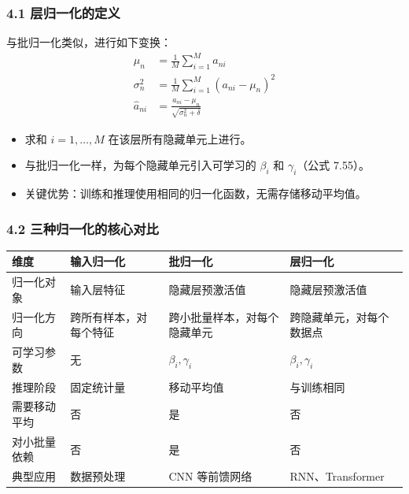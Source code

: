 \documentclass[t,aspectratio=169]{beamer} %
\begin{document}
\begin{frame}
    \frametitle{4.1 层归一化的定义}
    与批归一化类似，进行如下变换：
    \begin{align}
        \mu_n &= \frac{1}{M} \sum_{i=1}^M a_{ni} \tag{7.58} \\
        \sigma_n^2 &= \frac{1}{M} \sum_{i=1}^M (a_{ni} - \mu_n)^2 \tag{7.59} \\
        \widehat{a}_{ni} &= \frac{a_{ni} - \mu_n}{\sqrt{\sigma_n^2 + \delta}} \tag{7.60}
    \end{align}
    \begin{itemize}
        \item 求和 $i = 1, \dots, M$ 在\alert{该层所有隐藏单元}上进行。
        \item 与批归一化一样，为每个隐藏单元引入可学习的 $\beta_i$ 和 $\gamma_i$（公式 7.55）。
        \item \alert{关键优势}：训练和推理使用\alert{相同}的归一化函数，\alert{无需存储移动平均值}。
    \end{itemize}
\end{frame}

\begin{frame}
    \frametitle{4.2 三种归一化的核心对比}
    \begin{table}
        \centering
        \renewcommand{\arraystretch}{1.2}
        \footnotesize
        \begin{tabular}{|p{2.2cm}|p{2.8cm}|p{3.2cm}|p{3.2cm}|}
            \hline
            \textbf{维度} & \textbf{输入归一化} & \textbf{批归一化} & \textbf{层归一化} \\
            \hline
            归一化对象 & 输入层特征 & 隐藏层预激活值 & 隐藏层预激活值 \\
            \hline
            归一化方向 & 跨所有样本，对每个特征 & 跨小批量样本，对每个隐藏单元 & 跨隐藏单元，对每个数据点 \\
            \hline
            可学习参数 & 无 & $\beta_i, \gamma_i$ & $\beta_i, \gamma_i$ \\
            \hline
            推理阶段 & 固定统计量 & 移动平均值 & 与训练相同 \\
            \hline
            需要移动平均 & 否 & 是 & 否 \\
            \hline
            对小批量依赖 & 否 & 是 & 否 \\
            \hline
            典型应用 & 数据预处理 & CNN 等前馈网络 & RNN、Transformer \\
            \hline
        \end{tabular}
    \end{table}
\end{frame}
\end{document}
